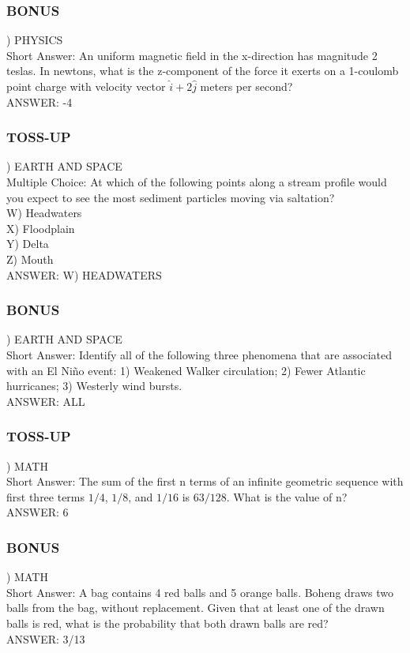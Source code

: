 \documentclass{article}
\begin{document}
\subsubsection*{BONUS}
) PHYSICS \\
Short Answer: An uniform magnetic field in the x-direction has magnitude 2 teslas. In newtons, what is the z-component of the force it exerts on a 1-coulomb point charge with velocity vector $\hat{i}+2\hat{j}$ meters per second? \\
ANSWER: -4

\subsubsection*{TOSS-UP}
) EARTH AND SPACE \\
Multiple Choice: At which of the following points along a stream profile would you expect to see the most sediment particles moving via saltation? \\
W) Headwaters \\
X) Floodplain \\
Y) Delta \\
Z) Mouth \\
ANSWER: W) HEADWATERS

\subsubsection*{BONUS}
) EARTH AND SPACE \\
Short Answer: Identify all of the following three phenomena that are associated with an El Ni\~{n}o event: 1) Weakened Walker circulation; 2) Fewer Atlantic hurricanes; 3) Westerly wind bursts. \\
ANSWER: ALL

\newpage

\subsubsection*{TOSS-UP}
) MATH \\
Short Answer: The sum of the first n terms of an infinite geometric sequence with first three terms $1/4$, $1/8$, and $1/16$ is $63/128$. What is the value of n? \\
ANSWER: 6

\subsubsection*{BONUS}
) MATH \\
Short Answer: A bag contains 4 red balls and 5 orange balls. Boheng draws two balls from the bag, without replacement. Given that at least one of the drawn balls is red, what is the probability that both drawn balls are red? \\
ANSWER: 3/13
\end{document}
